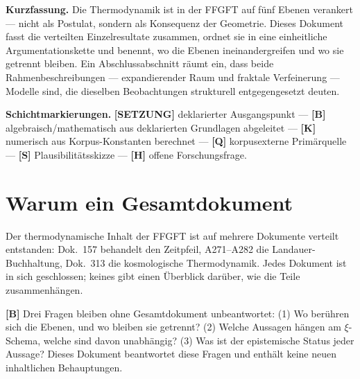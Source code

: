
\providecommand{\qedsq}{\raisebox{0.03em}{\framebox[0.62em]{\rule{0pt}{0.42em}}}}

\begingroup\small\noindent
\textbf{Kurzfassung.}
Die Thermodynamik ist in der FFGFT auf fünf Ebenen verankert ---
nicht als Postulat, sondern als Konsequenz der Geometrie.
Dieses Dokument fasst die verteilten Einzelresultate zusammen,
ordnet sie in eine einheitliche Argumentationskette und benennt,
wo die Ebenen ineinandergreifen und wo sie getrennt bleiben.
Ein Abschlussabschnitt räumt ein, dass beide Rahmenbeschreibungen ---
expandierender Raum und fraktale Verfeinerung --- Modelle sind,
die dieselben Beobachtungen strukturell entgegengesetzt deuten.
\par\endgroup

\bigskip

\begingroup\small\noindent
\textbf{Schichtmarkierungen.}
\textbf{[SETZUNG]} deklarierter Ausgangspunkt ---
\textbf{[B]} algebraisch/mathematisch aus deklarierten Grundlagen abgeleitet ---
\textbf{[K]} numerisch aus Korpus-Konstanten berechnet ---
\textbf{[Q]} korpusexterne Primärquelle ---
\textbf{[S]} Plausibilitätsskizze ---
\textbf{[H]} offene Forschungsfrage.
\par\endgroup

\bigskip

\section{Warum ein Gesamtdokument}

Der thermodynamische Inhalt der FFGFT ist auf mehrere Dokumente
verteilt entstanden: Dok.~157 behandelt den Zeitpfeil, A271--A282
die Landauer-Buchhaltung, Dok.~313 die kosmologische Thermodynamik.
Jedes Dokument ist in sich geschlossen; keines gibt einen Überblick
darüber, wie die Teile zusammenhängen.

\textbf{[B]} Drei Fragen bleiben ohne Gesamtdokument unbeantwortet:
(1) Wo berühren sich die Ebenen, und wo bleiben sie getrennt?
(2) Welche Aussagen hängen am $\xi$-Schema, welche sind davon unabhängig?
(3) Was ist der epistemische Status jeder Aussage?
Dieses Dokument beantwortet diese Fragen und enthält keine
neuen inhaltlichen Behauptungen.


